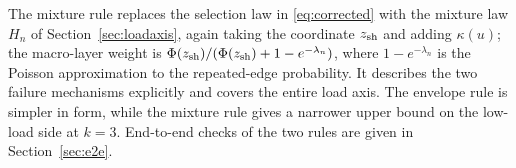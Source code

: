 The mixture rule replaces the selection law in \eqref{eq:corrected} with the mixture law $H_n$
of Section~\ref{sec:loadaxis}, again taking the coordinate $z_{\rm sh}$ and adding $\kappa(u)$;
the macro-layer weight is $\Phi(z_{\rm sh})/(\Phi(z_{\rm sh}) + 1 - e^{-\lambda_n})$, where
$1 - e^{-\lambda_n}$ is the Poisson approximation to the repeated-edge probability. It describes
the two failure mechanisms explicitly and covers the entire load axis. The envelope rule is
simpler in form, while the mixture rule gives a narrower upper bound on the low-load side at
$k=3$. End-to-end checks of the two rules are given in Section~\ref{sec:e2e}.
